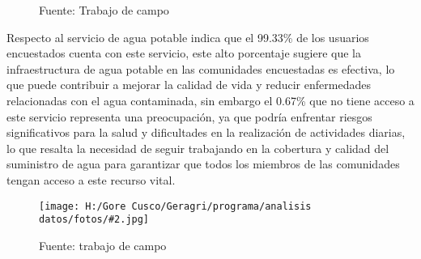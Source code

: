 \documentclass{article}\usepackage[]{graphicx}\usepackage[table]{xcolor}
\makeatletter
\newenvironment{kframe}{%
 \def\at@end@of@kframe{}%
 \ifinner\ifhmode%
  \def\at@end@of@kframe{\end{minipage}}%
  \begin{minipage}{\columnwidth}%
 \fi\fi%
 \def\FrameCommand##1{\hskip\@totalleftmargin \hskip-\fboxsep
 \colorbox{shadecolor}{##1}\hskip-\fboxsep
     \hskip-\linewidth \hskip-\@totalleftmargin \hskip\columnwidth}%
 \MakeFramed {\advance\hsize-\width
   \@totalleftmargin\z@ \linewidth\hsize
   \@setminipage}}%
 {\par\unskip\endMakeFramed%
 \at@end@of@kframe}
\newenvironment{knitrout}{}{} %
\newenvironment{fotos}[2]
{\begin{figure}[H]
	\centering
	\caption{#1}
	\texttt{[image: H:/Gore Cusco/Geragri/programa/analisis datos/fotos/\#2.jpg]}
	\caption*{Fuente: trabajo de campo}}
{\end{figure}}
\makeatother
\begin{document}
\begin{figure}[H]
  \centering
  \caption{Cuenta con el servicio de agua potable}
\begin{knitrout}
\color{fgcolor}\begin{kframe}


{\ttfamily\noindent\bfseries{}}

{\ttfamily\noindent{}}

{\ttfamily\noindent\bfseries{}}

{\ttfamily\noindent\bfseries\color{errorcolor}{\#\# Error: objeto 'datos' no encontrado}}

{\ttfamily\noindent\bfseries\color{errorcolor}{\#\# Error: objeto 'datos' no encontrado}}

{\ttfamily\noindent\bfseries\color{errorcolor}{\#\# Error: objeto 'datos' no encontrado}}

{\ttfamily\noindent\bfseries\color{errorcolor}{\#\# Error: objeto 'graph1' no encontrado}}\end{kframe}
\end{knitrout}
  \caption*{Fuente: Trabajo de campo}
\end{figure}
Respecto al servicio de agua potable indica que el 99.33\% de los usuarios encuestados cuenta con este servicio, este alto porcentaje sugiere que la infraestructura de agua potable en las  comunidades encuestadas es efectiva, lo que puede contribuir a mejorar la calidad de vida y reducir enfermedades relacionadas con el agua contaminada, sin embargo el 0.67\% que no tiene acceso a este servicio representa una preocupación, ya que podría enfrentar riesgos significativos para la salud y dificultades en la realización de actividades diarias, lo que resalta la necesidad de seguir trabajando en la cobertura y calidad del suministro de agua para garantizar que todos los miembros de las comunidades tengan acceso a este recurso vital.
\begin{fotos}
{Aplicacion de encuestas en el area de influencia}{7}
\end{fotos}
\end{document}
